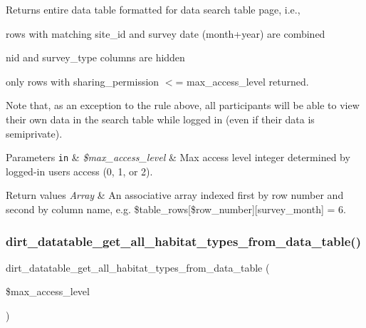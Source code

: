 Returns entire data table formatted for data search table page, i.\+e.,
\begin{DoxyItemize}
\item rows with matching site\+\_\+id and survey date (month+year) are combined
\item nid and survey\+\_\+type columns are hidden
\item only rows with sharing\+\_\+permission $<$= max\+\_\+access\+\_\+level returned.
\end{DoxyItemize}

Note that, as an exception to the rule above, all participants will be able to view their own data in the search table while logged in (even if their data is semiprivate).


\begin{DoxyParams}[1]{Parameters}
\mbox{\tt in}  & {\em \$max\+\_\+access\+\_\+level} & Max access level integer determined by logged-\/in user\textquotesingle{}s access (0, 1, or 2). \\
\hline
\end{DoxyParams}

\begin{DoxyRetVals}{Return values}
{\em Array} & An associative array indexed first by row number and second by column name, e.\+g. \$table\+\_\+rows\mbox{[}\$row\+\_\+number\mbox{]}\mbox{[}\textquotesingle{}survey\+\_\+month\textquotesingle{}\mbox{]} = 6. \\
\hline
\end{DoxyRetVals}
\mbox{\label{dirt__datatable_8search__table__db__ops_8inc_aa00c9db99f16c0b4144b6c5f00eba9d2}} 
\subsubsection{\texorpdfstring{dirt\+\_\+datatable\+\_\+get\+\_\+all\+\_\+habitat\+\_\+types\+\_\+from\+\_\+data\+\_\+table()}{dirt\_datatable\_get\_all\_habitat\_types\_from\_data\_table()}}
{\footnotesize\ttfamily dirt\+\_\+datatable\+\_\+get\+\_\+all\+\_\+habitat\+\_\+types\+\_\+from\+\_\+data\+\_\+table (\begin{DoxyParamCaption}\item[{}]{\$max\+\_\+access\+\_\+level }\end{DoxyParamCaption})}

